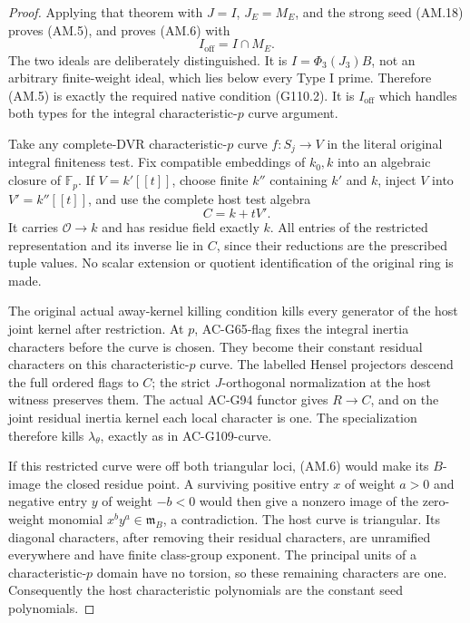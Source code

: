 \begin{proof}
Applying that theorem with \(J=I\), \(J_E=M_E\), and
the strong seed (AM.18) proves (AM.5), and proves (AM.6)
with
\[
                         I_{\mathrm{off}}=I\cap M_E .
 \tag{AM.20}
\]
The two ideals are deliberately distinguished.
It is \(I=\Phi_3(J_3)B\), not an arbitrary finite-weight
ideal, which lies below every Type I prime.  Therefore
(AM.5) is exactly the required native condition (G110.2).
It is \(I_{\mathrm{off}}\) which handles both types for
the integral characteristic-\(p\) curve argument.

Take any complete-DVR characteristic-\(p\) curve
\(f:S_j\to V\) in the literal original integral finiteness
test.  Fix compatible embeddings of \(k_0,k\) into an
algebraic closure of \(\mathbb F_p\).
If \(V=k'[[t]]\), choose finite \(k''\) containing \(k'\)
and \(k\), inject \(V\) into \(V'=k''[[t]]\), and use
the complete host test algebra
\[
                          C=k+tV'.
 \tag{AM.21}
\]
It carries \(\mathcal O\to k\) and has residue field exactly
\(k\).  All entries of the restricted representation and
its inverse lie in \(C\), since their reductions are the
prescribed tuple values.  No scalar extension or quotient
identification of the original ring is made.

The original actual away-kernel killing condition kills
every generator of the host joint kernel after restriction.
At \(p\), AC-G65-flag fixes the integral inertia characters
before the curve is chosen.  They become their constant
residual characters on this characteristic-\(p\) curve.
The labelled Hensel projectors descend the full ordered
flags to \(C\); the strict \(J\)-orthogonal normalization
at the host witness preserves them.  The actual AC-G94
functor gives \(R\to C\), and on the joint residual
inertia kernel each local character is one.
The specialization therefore kills \(\lambda_\theta\),
exactly as in AC-G109-curve.

If this restricted curve were off both triangular loci,
(AM.6) would make its \(B\)-image the closed residue point.
A surviving positive entry \(x\) of weight \(a>0\) and
negative entry \(y\) of weight \(-b<0\) would then give
a nonzero image of the zero-weight monomial
\(x^b y^a\in\mathfrak m_B\), a contradiction.
The host curve is triangular.  Its diagonal characters,
after removing their residual characters, are unramified
everywhere and have finite class-group exponent.
The principal units of a characteristic-\(p\) domain
have no torsion, so these remaining characters are one.
Consequently the host characteristic polynomials are
the constant seed polynomials.


\end{proof}
